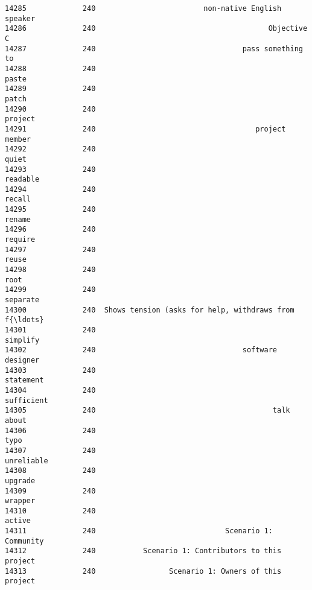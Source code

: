 \documentclass[11pt]{article}
\begin{document}
\begin{Verbatim}[commandchars=\\\{\}]
14285             240                         non-native English speaker   
14286             240                                        Objective C   
14287             240                                  pass something to   
14288             240                                              paste   
14289             240                                              patch   
14290             240                                            project   
14291             240                                     project member   
14292             240                                              quiet   
14293             240                                           readable   
14294             240                                             recall   
14295             240                                             rename   
14296             240                                            require   
14297             240                                              reuse   
14298             240                                               root   
14299             240                                           separate   
14300             240  Shows tension (asks for help, withdraws from f{\ldots}   
14301             240                                           simplify   
14302             240                                  software designer   
14303             240                                          statement   
14304             240                                         sufficient   
14305             240                                         talk about   
14306             240                                               typo   
14307             240                                         unreliable   
14308             240                                            upgrade   
14309             240                                            wrapper   
14310             240                                             active   
14311             240                              Scenario 1: Community   
14312             240           Scenario 1: Contributors to this project   
14313             240                 Scenario 1: Owners of this project   


\end{Verbatim}
\end{document}
